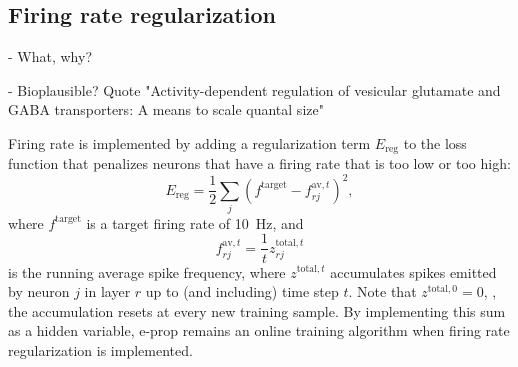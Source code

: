 	\subsection{Firing rate regularization}
		\begin{tcolorbox}[colback=orange]
		- What, why?

		- Bioplausible? Quote "Activity-dependent regulation of vesicular glutamate and GABA transporters: A means to scale quantal size"

		\end{tcolorbox}
		Firing rate is implemented by adding a regularization term $E_\text{reg}$ to the loss function that penalizes neurons that have a firing rate that is too low or too high:
		\begin{equation}
			E_\text{reg} = \frac{1}{2}\sum_j\left(f^\text{target} - f^{\text{av}, t}_{rj}\right)^2,
		\end{equation}
		where $f^\text{target}$ is a target firing rate of \SI{10}{\Hz}, and
		\begin{equation}
		f^{\text{av},t}_{rj} = \frac{1}{t} z^{\text{total},t}_{rj}
		\end{equation}
		is the running average spike frequency, where $z^{\text{total},t}$ accumulates spikes emitted by neuron $j$ in layer $r$ up to (and including) time step $t$.
		Note that $z^{\text{total},0} = 0$, \ie, the accumulation resets at every new training sample.
		By implementing this sum as a hidden variable, e-prop remains an online training algorithm when firing rate regularization is implemented.

